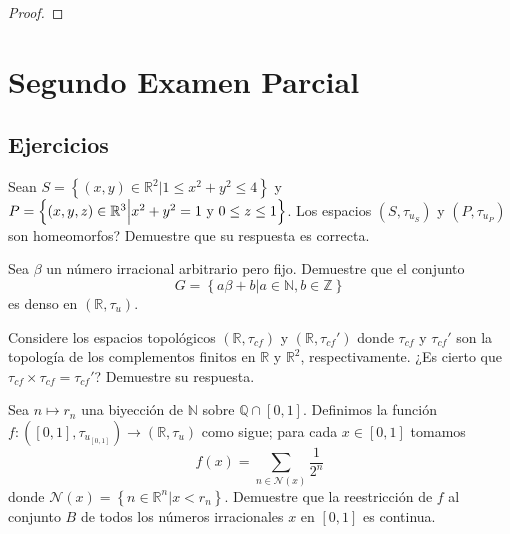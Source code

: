 \documentclass[12pt]{report}
\theoremstyle{largebreak}
\newcommand\cf[3]{\ensuremath{#1:#2\rightarrow#3}}
\begin{document}
    \begin{proof}
        
    \end{proof}

    \chapter{Segundo Examen Parcial}

    \section{Ejercicios}

    \begin{excer}
        Sean $S=\left\{(x,y)\in\mathbb{R}^2\Big|1\leq x^2+y^2\leq 4 \right\}$ y $P=\left\{(x,y,z)\in\mathbb{R}^3\Big|x^2+y^2=1\textup{ y }0\leq z\leq 1 \right\}$. Los espacios $(S,\tau_{u_S})$ y $(P,\tau_{u_P})$ son homeomorfos? Demuestre que su respuesta es correcta.
    \end{excer}

    \begin{excer}
        Sea $\beta$ un número irracional arbitrario pero fijo. Demuestre que el conjunto 
        \begin{equation*}
            G=\left\{a\beta+b\Big|a\in\mathbb{N},b\in\mathbb{Z} \right\}
        \end{equation*}
        es denso en $(\mathbb{R},\tau_u)$.
    \end{excer}

    \begin{excer}
        Considere los espacios topológicos $(\mathbb{R},\tau_{cf})$ y $(\mathbb{R},\tau_{cf}')$ donde $\tau_{cf}$ y $\tau_{cf}'$ son la topología de los complementos finitos en $\mathbb{R}$ y $\mathbb{R}^2$, respectivamente. ¿Es cierto que $\tau_{cf}\times\tau_{cf}=\tau_{cf}'$? Demuestre su respuesta.
    \end{excer}

    \begin{excer}
        Sea $n\mapsto r_n$ una biyección de $\mathbb{N}$ sobre $\mathbb{Q}\cap [0,1]$. Definimos la función $\cf{f}{([0,1],\tau_{u_{[0,1]}})}{(\mathbb{R},\tau_u)}$ como sigue; para cada $x\in [0,1]$ tomamos 
        \begin{equation*}
            f(x)=\sum_{n\in\mathcal{N}(x) }\frac{1}{2^n}
        \end{equation*}
        donde $\mathcal{N}(x)=\left\{n\in\mathbb{R}^n\Big|x<r_n \right\}$. Demuestre que la reestricción de $f$ al conjunto $B$ de todos los números irracionales $x$ en $[0,1]$ es continua.
    \end{excer}
\end{document}
